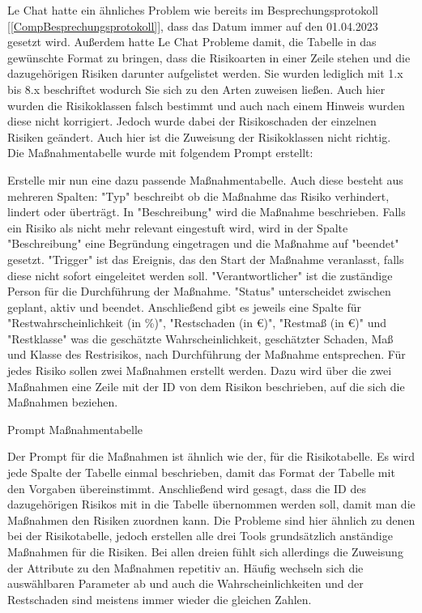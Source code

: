 Le Chat hatte ein ähnliches Problem wie bereits im Besprechungsprotokoll [\autoref{CompBesprechungsprotokoll}], dass das 
Datum immer auf den 01.04.2023 gesetzt wird. Außerdem hatte Le Chat Probleme damit, die Tabelle in das gewünschte Format
zu bringen, dass die Risikoarten in einer Zeile stehen und die dazugehörigen Risiken darunter aufgelistet werden. Sie wurden 
lediglich mit 1.x bis 8.x beschriftet wodurch Sie sich zu den Arten zuweisen ließen. Auch 
hier wurden die Risikoklassen falsch bestimmt und auch nach einem Hinweis wurden diese nicht korrigiert. Jedoch wurde 
dabei der Risikoschaden der einzelnen Risiken geändert. Auch hier ist die Zuweisung der Risikoklassen nicht richtig.\\

Die Maßnahmentabelle wurde mit folgendem Prompt erstellt:

\begin{prompt}[H]
    \begin{tcolorbox}[colback=gray!20, colframe=gray!20, boxrule=0pt, sharp corners] 
        Erstelle mir nun eine dazu passende Maßnahmentabelle. Auch diese besteht aus mehreren Spalten: "Typ" beschreibt 
        ob die Maßnahme das Risiko verhindert, lindert oder überträgt. In "Beschreibung" wird die Maßnahme beschrieben. 
        Falls ein Risiko als nicht mehr relevant eingestuft wird, wird in der Spalte "Beschreibung" eine Begründung 
        eingetragen und die Maßnahme auf "beendet" gesetzt. "Trigger" ist das Ereignis, das den Start der Maßnahme 
        veranlasst, falls diese nicht sofort eingeleitet werden soll. "Verantwortlicher" ist die zuständige Person für 
        die Durchführung der Maßnahme. "Status" unterscheidet zwischen geplant, aktiv und beendet. Anschließend gibt es 
        jeweils eine Spalte für "Restwahrscheinlichkeit (in \%)", "Restschaden (in €)", "Restmaß (in €)" und "Restklasse" 
        was die geschätzte Wahrscheinlichkeit, geschätzter Schaden, Maß und Klasse des Restrisikos, nach Durchführung der 
        Maßnahme entsprechen. Für jedes Risiko sollen zwei Maßnahmen erstellt werden. Dazu wird über die zwei Maßnahmen 
        eine Zeile mit der ID von dem Risikon beschrieben, auf die sich die Maßnahmen beziehen.
        \vfill
    \end{tcolorbox}
    \caption{Prompt Maßnahmentabelle}
    \label{Prompt Maßnahmentabelle}
\end{prompt}

Der Prompt für die Maßnahmen ist ähnlich wie der, für die Risikotabelle. Es wird jede Spalte der Tabelle einmal beschrieben,
damit das Format der Tabelle mit den Vorgaben übereinstimmt. Anschließend wird gesagt, dass die ID des dazugehörigen Risikos
mit in die Tabelle übernommen werden soll, damit man die Maßnahmen den Risiken zuordnen kann. Die Probleme sind hier 
ähnlich zu denen bei der Risikotabelle, jedoch erstellen alle drei Tools grundsätzlich anständige Maßnahmen für die Risiken.
Bei allen dreien fühlt sich allerdings die Zuweisung der Attribute zu den Maßnahmen repetitiv an. Häufig wechseln sich die 
auswählbaren Parameter ab und auch die Wahrscheinlichkeiten und der Restschaden sind meistens immer wieder die gleichen Zahlen.\\

